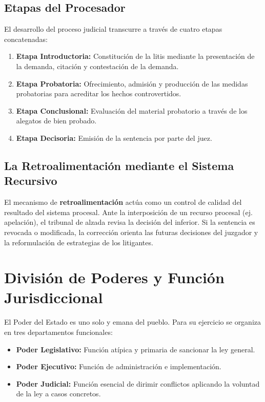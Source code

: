 \documentclass[12pt,oneside]{book}
\begin{document}
\subsection{Etapas del Procesador}
El desarrollo del proceso judicial transcurre a través de cuatro etapas concatenadas:
\begin{enumerate}
    \item \textbf{Etapa Introductoria:} Constitución de la litis mediante la presentación de la demanda, citación y contestación de la demanda.
    \item \textbf{Etapa Probatoria:} Ofrecimiento, admisión y producción de las medidas probatorias para acreditar los hechos controvertidos.
    \item \textbf{Etapa Conclusional:} Evaluación del material probatorio a través de los alegatos de bien probado.
    \item \textbf{Etapa Decisoria:} Emisión de la sentencia por parte del juez.
\end{enumerate}

\subsection{La Retroalimentación mediante el Sistema Recursivo}
El mecanismo de \textbf{retroalimentación} actúa como un control de calidad del resultado del sistema procesal. Ante la interposición de un recurso procesal (ej. apelación), el tribunal de alzada revisa la decisión del inferior. Si la sentencia es revocada o modificada, la corrección orienta las futuras decisiones del juzgador y la reformulación de estrategias de los litigantes.

\section{División de Poderes y Función Jurisdiccional}
El Poder del Estado es uno solo y emana del pueblo. Para su ejercicio se organiza en tres departamentos funcionales:
\begin{itemize}
    \item \textbf{Poder Legislativo:} Función atípica y primaria de sancionar la ley general.
    \item \textbf{Poder Ejecutivo:} Función de administración e implementación.
    \item \textbf{Poder Judicial:} Función esencial de dirimir conflictos aplicando la voluntad de la ley a casos concretos.
\end{itemize}
\end{document}

